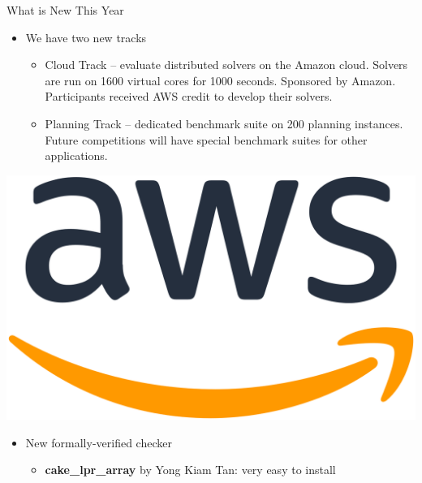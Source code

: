 \documentclass{beamer}
\begin{document}
\begin{frame}{What is New This Year}

\begin{minipage}{.7\textwidth}
\begin{itemize}
  \item We have two new tracks
  \begin{itemize}
  \item Cloud Track -- evaluate distributed solvers on the Amazon cloud. Solvers are run on 1600 virtual cores for 1000 seconds. 
  Sponsored by Amazon. Participants received AWS credit to develop their solvers.
  \item Planning Track -- dedicated benchmark suite on 200 planning instances. Future competitions will have special benchmark suites for other applications.
  \end{itemize}
\end{itemize}
\end{minipage}
\begin{minipage}{.28\textwidth}
\centering
\includegraphics[width=.9\textwidth]{AWSlogo}
\end{minipage}

\medskip

\begin{itemize}
  \item New formally-verified checker
  \begin{itemize}
	\item {\bf cake\_lpr\_array} by Yong Kiam Tan: very easy to install
  \end{itemize}
\end{itemize}
\end{frame}
\end{document}
